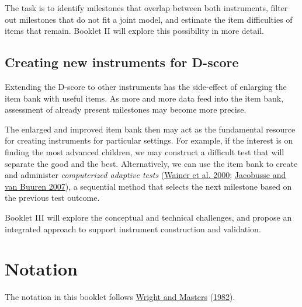 \documentclass[
]{book}
\begin{document}
The task is to identify milestones that overlap between both instruments, filter out milestones that do not fit a joint model, and estimate the item difficulties of items that remain. Booklet II will explore this possibility in more detail.

\hypertarget{creating-new-instruments-for-d-score}{%
\section{Creating new instruments for D-score}\label{creating-new-instruments-for-d-score}}

Extending the D-score to other instruments has the side-effect of enlarging the item bank with useful items. As more and more data feed into the item bank, assessment of already present milestones may become more precise.

The enlarged and improved item bank then may act as the fundamental resource for creating instruments for particular settings. For example, if the interest is on finding the most advanced children, we may construct a difficult test that will separate the good and the best. Alternatively, we can use the item bank to create and administer \emph{computerized adaptive tests} (\protect\hyperlink{ref-wainer2000}{Wainer et al. 2000}; \protect\hyperlink{ref-jacobusse2007}{Jacobusse and van Buuren 2007}), a sequential method that selects the next milestone based on the previous test outcome.

Booklet III will explore the conceptual and technical challenges, and propose an integrated approach to support instrument construction and validation.

\hypertarget{appendix-appendices}{%
\appendix}


\hypertarget{ap:notation}{%
\chapter{Notation}\label{ap:notation}}

The notation in this booklet follows \protect\hyperlink{ref-wright1982}{Wright and Masters} (\protect\hyperlink{ref-wright1982}{1982}).
\end{document}
